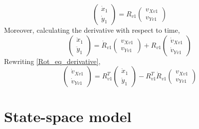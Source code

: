 \documentclass[12pt]{article}
\begin{document}
\begin{equation} \label{Rot_velocities_eq}
    \begin{pmatrix} \dot{x}_1 \\ \dot{y}_1 \end{pmatrix} = R_{v1} \begin{pmatrix} v_{Xv1} \\ v_{Yv1} \end{pmatrix}
\end{equation}
Moreover, calculating the derivative with respect to time,
\begin{equation}\label{Rot_eq_derivative}
    \begin{pmatrix} \ddot{x}_1 \\ \ddot{y}_1 \end{pmatrix} = \dot{R}_{v1} \begin{pmatrix} v_{Xv1} \\ v_{Yv1} \end{pmatrix} + R_{v1} \begin{pmatrix} \dot{v}_{Xv1} \\ \dot{v}_{Yv1} \end{pmatrix}
\end{equation}
Rewriting \eqref{Rot_eq_derivative},
\begin{equation}\label{velocity_fixed_unit_1_eq}
    \begin{pmatrix} \dot{v}_{Xv1} \\ \dot{v}_{Yv1} \end{pmatrix} = R_{v1}^T \begin{pmatrix} \ddot{x}_1 \\ \ddot{y}_1 \end{pmatrix} - R_{v1}^T \dot{R}_{v1} \begin{pmatrix} v_{Xv1} \\ v_{Yv1} \end{pmatrix} 
\end{equation}
\section{State-space model}
\end{document}
